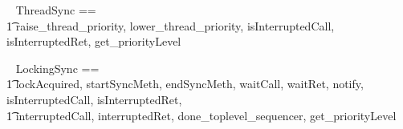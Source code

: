 %

\begin{circus}
\circchannelset ~ ThreadSync == \\ \t1  \lchanset raise\_thread\_priority, lower\_thread\_priority, isInterruptedCall, isInterruptedRet, get\_priorityLevel \rchanset
\end{circus}

\begin{circus}
\circchannelset ~ LockingSync == \\ \t1  \lchanset lockAcquired, startSyncMeth, endSyncMeth, waitCall, waitRet, notify, isInterruptedCall, isInterruptedRet, \\
\t1 interruptedCall, interruptedRet, done\_toplevel\_sequencer, get\_priorityLevel  \rchanset
\end{circus}

%

